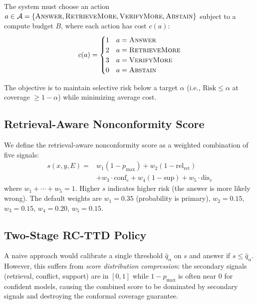 \documentclass[letterpaper]{article}
\begin{document}
The system must choose an action $a \in \mathcal{A} = \{\textsc{Answer}, \textsc{RetrieveMore}, \textsc{VerifyMore}, \textsc{Abstain}\}$ subject to a compute budget $B$, where each action has cost $c(a)$:
\[
c(a) = \begin{cases} 1 & a = \textsc{Answer} \\ 2 & a = \textsc{RetrieveMore} \\ 3 & a = \textsc{VerifyMore} \\ 0 & a = \textsc{Abstain} \end{cases}
\]

The objective is to maintain selective risk below a target $\alpha$ (i.e., $\text{Risk} \leq \alpha$ at coverage $\geq 1-\alpha$) while minimizing average cost.

\subsection{Retrieval-Aware Nonconformity Score}

We define the retrieval-aware nonconformity score as a weighted combination of five signals:
\begin{equation}
\begin{aligned}
s(x, y, E) ={}& w_1(1 - p_{\max}) + w_2(1 - \text{rel}_{\text{ret}}) \\
&+ w_3 \cdot \text{conf}_e + w_4(1 - \text{sup}) + w_5 \cdot \text{dis}_v
\end{aligned}
\label{eq:score}
\end{equation}
where $w_1 + \cdots + w_5 = 1$. Higher $s$ indicates higher risk (the answer is more likely wrong). The default weights are $w_1 = 0.35$ (probability is primary), $w_2 = 0.15$, $w_3 = 0.15$, $w_4 = 0.20$, $w_5 = 0.15$.

\subsection{Two-Stage RC-TTD Policy}

A naive approach would calibrate a single threshold $\hat{q}_\alpha$ on $s$ and answer if $s \leq \hat{q}_\alpha$. However, this suffers from \emph{score distribution compression}: the secondary signals (retrieval, conflict, support) are in $[0,1]$ while $1-p_{\max}$ is often near $0$ for confident models, causing the combined score to be dominated by secondary signals and destroying the conformal coverage guarantee.
\end{document}
